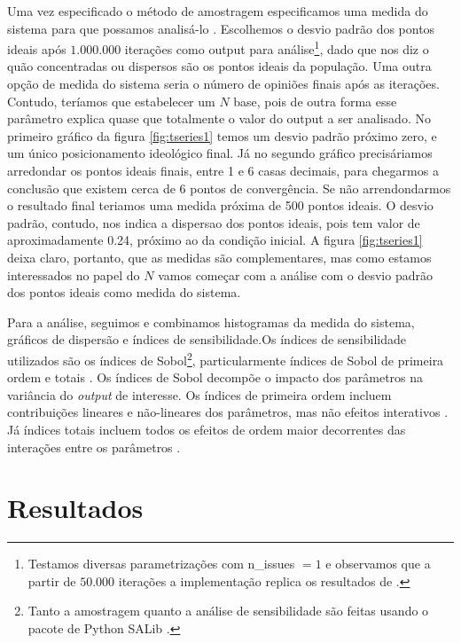 Uma vez especificado o método de amostragem especificamos uma medida do sistema
para que possamos analisá-lo \cite{railsback2012agent}. Escolhemos o desvio
padrão dos pontos ideais após \(1.000.000\) iterações como output para
análise\footnote{Testamos diversas parametrizações com n\_issues \(= 1\) e
  observamos que a partir de \(50.000\) iterações a implementação replica os
  resultados de .}, dado que nos diz o quão
concentradas ou dispersos são os pontos ideais da população. Uma outra opção de
medida do sistema seria o número de opiniões finais após as iterações. Contudo,
teríamos que estabelecer um \(N\) base, pois de outra forma esse parâmetro
explica quase que totalmente o valor do output a ser analisado. No primeiro
gráfico da figura \ref{fig:tseries1} temos um desvio padrão próximo zero, e um
único posicionamento ideológico final. Já no segundo gráfico precisáriamos
arredondar os pontos ideais finais, entre 1 e 6 casas decimais, para
chegarmos a conclusão que existem cerca de 6 pontos de convergência. Se não arrendondarmos o
resultado final teriamos uma medida próxima de 500 pontos ideais. O desvio
padrão, contudo, nos indica a dispersao dos pontos ideais, pois tem valor de
aproximadamente 0.24, próximo ao da condição inicial. A figura \ref{fig:tseries1}
deixa claro, portanto, que as medidas são complementares, mas como estamos
interessados no papel do \(N\) vamos começar com a análise com o desvio padrão
dos pontos ideais como medida do sistema.


Para a análise, seguimos  e combinamos
histogramas da medida do sistema, gráficos de dispersão e índices de
sensibilidade.Os índices de sensibilidade utilizados são os índices de
Sobol\footnote{Tanto a amostragem quanto a análise de sensibilidade são feitas
  usando o pacote de Python SALib \cite{herman2017salib}.}, particularmente
índices de Sobol de primeira ordem e totais \cite{saltelli2008global}. Os
índices de Sobol decompõe o impacto dos parâmetros na variância do
\textit{output} de interesse. Os índices de primeira ordem incluem contribuições
lineares e não-lineares dos parâmetros, mas não efeitos interativos
\cite{ten2016sensitivity}. Já índices totais incluem todos os efeitos de ordem
maior decorrentes das interações entre os parâmetros \cite{saltelli2008global}.

\section{Resultados}

